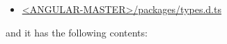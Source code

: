 \begin{itemize}
  \item \href{https://github.com/angular/angular/blob/master/modules/types.d.ts}
        {<ANGULAR-MASTER>/packages/types.d.ts}
\end{itemize}

and it has the following contents:




